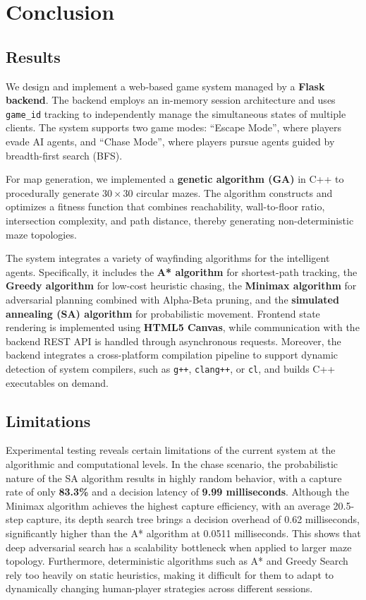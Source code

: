 \documentclass[12pt,a4paper]{article}
\begin{document}
\section{Conclusion}

\subsection{Results}

We design and implement a web-based game system managed by a \textbf{Flask backend}. The backend employs an in-memory session architecture and uses \texttt{game\_id} tracking to independently manage the simultaneous states of multiple clients. The system supports two game modes: ``Escape Mode'', where players evade AI agents, and ``Chase Mode'', where players pursue agents guided by breadth-first search (BFS).

For map generation, we implemented a \textbf{genetic algorithm (GA)} in C++ to procedurally generate $30\times30$ circular mazes. The algorithm constructs and optimizes a fitness function that combines reachability, wall-to-floor ratio, intersection complexity, and path distance, thereby generating non-deterministic maze topologies.

The system integrates a variety of wayfinding algorithms for the intelligent agents. Specifically, it includes the \textbf{A* algorithm} for shortest-path tracking, the \textbf{Greedy algorithm} for low-cost heuristic chasing, the \textbf{Minimax algorithm} for adversarial planning combined with Alpha-Beta pruning, and the \textbf{simulated annealing (SA) algorithm} for probabilistic movement. Frontend state rendering is implemented using \textbf{HTML5 Canvas}, while communication with the backend REST API is handled through asynchronous requests. Moreover, the backend integrates a cross-platform compilation pipeline to support dynamic detection of system compilers, such as \texttt{g++}, \texttt{clang++}, or \texttt{cl}, and builds C++ executables on demand.

\subsection{Limitations}

Experimental testing reveals certain limitations of the current system at the algorithmic and computational levels. In the chase scenario, the probabilistic nature of the SA algorithm results in highly random behavior, with a capture rate of only \textbf{83.3\%} and a decision latency of \textbf{9.99 milliseconds}. Although the Minimax algorithm achieves the highest capture efficiency, with an average 20.5-step capture, its depth search tree brings a decision overhead of 0.62 milliseconds, significantly higher than the A* algorithm at 0.0511 milliseconds. This shows that deep adversarial search has a scalability bottleneck when applied to larger maze topology. Furthermore, deterministic algorithms such as A* and Greedy Search rely too heavily on static heuristics, making it difficult for them to adapt to dynamically changing human-player strategies across different sessions.
\end{document}
